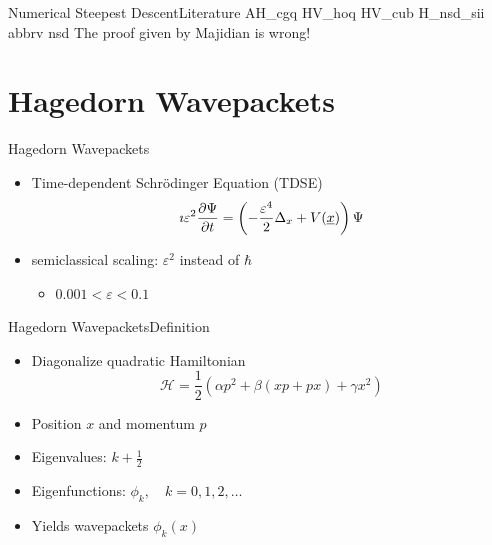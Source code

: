 \documentclass{beamer}
\begin{document}
\begin{frame}{Numerical Steepest Descent}{Literature}
  \nocite{nsd}{AH_cgq}
  \nocite{nsd}{HV_hoq}
  \nocite{nsd}{HV_cub}
  \nocite{nsd}{H_nsd_sii}
  \scriptsize
  {abbrv}
  {nsd}{}
  \vspace{0.4cm}
  \footnoterule
  {\tiny The proof given by Majidian is wrong!}
\end{frame}


\section{Hagedorn Wavepackets}


\begin{frame}{Hagedorn Wavepackets}
  \begin{itemize}
    \item Time-dependent Schr\"odinger Equation (TDSE)
    \begin{equation*}
      \imath \varepsilon^2 \frac{\partial \Psi}{\partial t} = \left(-\frac{\varepsilon^4}{2}\Delta_x + V(\underline{x})\right) \Psi
    \end{equation*}
    \vspace{0.3cm}
    \item semiclassical scaling: $\varepsilon^2$ instead of $\hbar$
    \begin{itemize}
      \item $0.001 < \varepsilon < 0.1$
    \end{itemize}
  \end{itemize}
\end{frame}


\begin{frame}{Hagedorn Wavepackets}{Definition}
  \begin{itemize}
    \item Diagonalize quadratic Hamiltonian
      \begin{equation*}
        \mathcal{H} = \frac{1}{2} \left(\alpha p^2 + \beta (x p + p x) + \gamma x^2\right)
      \end{equation*}
    \item Position $x$ and momentum $p$
    \item Eigenvalues: $k + \frac{1}{2}$
    \item Eigenfunctions: $\phi_k, \quad k = 0, 1, 2, \ldots$
    \item Yields wavepackets $\phi_k(x)$
  \end{itemize}
\end{frame}
\end{document}
